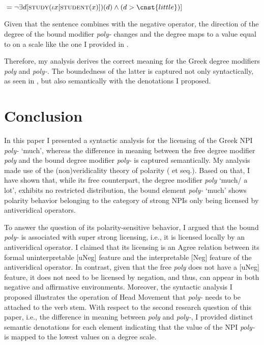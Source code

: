 \documentclass[output=paper]{langscibook}
\begin{document}
\begin{exe}
\ex\label{gia:ex43}
${}= \neg \exists d[\textsc{study}(\iota x [\textsc{student}(x)]) (d) \wedge (d > \cnst{little})]$
\end{exe}

\noindent Given that the sentence combines with the negative operator, the direction of the degree of the bound modifier \textit{poly-} changes and the degree maps to a value equal to  on a scale like the one I provided in .

Therefore, my analysis derives the correct meaning for the Greek degree modifiers \textit{poly} and \textit{poly-}. The boundedness of the latter is captured not only syntactically, as seen in , but also semantically with the denotations I proposed.

\section{Conclusion} \label{gia:sec:conclusion}

In this paper I presented a syntactic analysis for the licensing of the Greek NPI \textit{poly-} ‘much’, whereas the difference in meaning between the free degree modifier \textit{poly} and the bound degree modifier \textit{poly-} is captured semantically. My analysis made use of the (non)veridicality theory of polarity (\citealt{giannakidou1994licensing,giannaki1997dissert,giannaki1998} et seq.). Based on that, I have shown that, while its free counterpart, the degree modifier \textit{poly} ‘much/ a lot’, exhibits no restricted distribution, the bound element \textit{poly-} ‘much’ shows polarity behavior belonging to the category of strong NPIs only being licensed by antiveridical operators.

To answer the question of its polarity-sensitive behavior, I argued that the bound \textit{poly-} is associated with super strong licensing, i.e., it is licensed locally by an antiveridical operator. I claimed that its licensing is an Agree relation between its formal uninterpretable [uNeg] feature and the interpretable [Neg] feature of the antiveridical operator. In contrast, given that the free \textit{poly} does not have a [uNeg] feature, it does not need to be licensed by negation, and thus, can appear in both negative and affirmative environments. Moreover, the syntactic analysis I proposed illustrates the operation of Head Movement that \textit{poly-} needs to be attached to the verb stem. With respect to the second research question of this paper, i.e., the difference in meaning between \textit{poly} and \textit{poly-}, I provided distinct semantic denotations for each element indicating that the value of the NPI \textit{poly-} is mapped to the lowest values on a degree scale.
\end{document}
